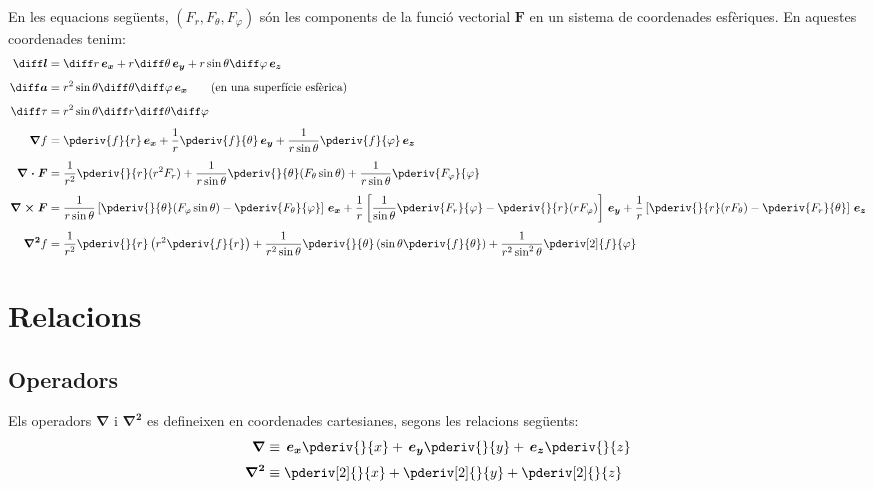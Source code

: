 \documentclass[catalan,a4paper,twoside,11pt]{article}
\begin{document}
En les equacions següents, $(F_r,F_\theta,F_\varphi)$  són
les components de la funció  vectorial  $\boldsymbol{F}$ en un sistema de
coordenades esfèriques. En aquestes coordenades tenim:
\begin{align}
    \boldsymbol{\diff l} &= \diff r \va + r\diff\theta \vb + r \sin\theta\diff \varphi \vc\\[1ex]
    \boldsymbol{\diff a} &= r^2 \sin\theta \diff \theta \diff \varphi \va\qquad\text{(en una superfície esfèrica)}\\[1ex]
    \diff\tau &= r^2 \sin\theta\diff r \diff \theta \diff \varphi\\[1ex]
    \boldsymbol{\nabla}f &= \pderiv{f}{r}\va + \frac{1}{r}\pderiv{f}{\theta}\vb
    + \frac{1}{r\sin\theta}\pderiv{f}{\varphi}\vc\\[1ex]
    \boldsymbol{\nabla\cdot F} &= \frac{1}{r^2}\pderiv{}{r}(r^2 F_r) +
    \frac{1}{r\sin\theta}\pderiv{}{\theta}(F_\theta\sin\theta)+
    \frac{1}{r\sin\theta}\pderiv{F_\varphi}{\varphi}\\[1ex]
    \boldsymbol{\nabla\times F} &= \frac{1}{r\sin\theta}\left[\pderiv{}{\theta}
    (F_\varphi\sin\theta)-\pderiv{F_\theta}{\varphi}\right]\va +
    \frac{1}{r}\left[\frac{1}{\sin\theta}\pderiv{F_r}{\varphi}-
    \pderiv{}{r}(r F_\varphi)\right]\vb +\frac{1}{r}\left[\pderiv{}{r}(r F_\theta)-\pderiv{F_r}{\theta}\right]\vc\\[1ex]
    \boldsymbol{\nabla^2}f &= \frac{1}{r^2}\pderiv{}{r}\left(r^2\pderiv{f}{r}
    \right) + \frac{1}{r^2\sin\theta}\pderiv{}{\theta}\left(\sin\theta\pderiv{f}{\theta}\right) +
    \frac{1}{r^2\sin^2\theta}\pderiv[2]{f}{\varphi}
\end{align}


\section{Relacions}

\subsection{Operadors}
\renewcommand{\va}{\ensuremath{\,\boldsymbol{e_x}}}
\renewcommand{\vb}{\ensuremath{\,\boldsymbol{e_y}}}
\renewcommand{\vc}{\ensuremath{\,\boldsymbol{e_z}}}
Els operadors $\boldsymbol{\nabla}$ i $\boldsymbol{\nabla^2}$ es defineixen en coordenades cartesianes, segons les relacions següents:
\begin{align}
    \boldsymbol{\nabla} &\equiv \va \pderiv{}{x} + \vb \pderiv{}{y}
    + \vc \pderiv{}{z}\\[0.5ex]
    \boldsymbol{\nabla^2} &\equiv \pderiv[2]{}{x} + \pderiv[2]{}{y}+ \pderiv[2]{}{z}
\end{align}
\end{document}
